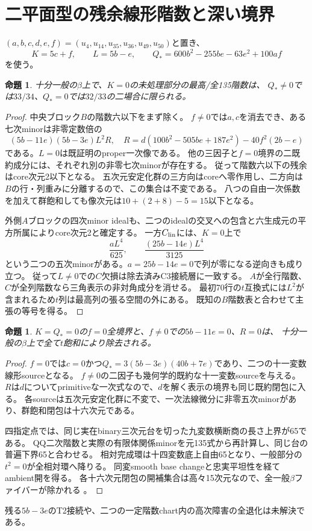 \documentclass[11pt,a4paper]{ltjsarticle}
\newtheorem{proposition}[theorem]{命題}
\theoremstyle{remark}
\begin{document}
\section{二平面型の残余線形階数と深い境界}
$(a,b,c,d,e,f)=(u_4,u_{14},u_{35},u_{36},u_{49},u_{50})$と置き、
\[
 K=5c+f,\qquad L=5b-e,\qquad Q_*=600b^2-255be-63e^2+100af
\]
を使う。
\begin{proposition}
十分一般の$\beta$上で、$K=0$の未処理部分の最高/全135階数は、
$Q_*\ne0$では$33/34$、$Q_*=0$では$32/33$の二場合に限られる。
\end{proposition}
\begin{proof}
中央ブロック$B$の階数六以下をまず除く。
$f\ne0$では$a,c$を消去でき、ある七次minorは非零定数倍の
\[
 (5b-11e)(5b-3e)L^2R,\quad
 R=d(100b^2-505be+187e^2)-40f^2(2b-e)
\]
である。$L=0$は既証明のproper一次像である。
他の三因子と$f=0$境界の二既約成分には、それぞれ別の非零七次minorが存在する。
従って階数六以下の残余はcore次元2以下となる。
五次元安定化群の三方向はcoreへ零作用し、二方向は$B$の行・列重みに分離するので、この集合は不変である。
八つの自由一次係数を加えて群飽和しても像次元は$10+(2+8)-5=15$以下となる\cite{binary-rank6-v41}。

外側$A$ブロックの四次minor idealも、二つのidealの交叉への包含と六生成元の平方所属によりcore次元2と確定する。
一方$C_{\rm lin}$には、$K=0$上で
\[
 \frac{aL^4}{625},\qquad \frac{(25b-14e)L^4}{3125}
\]
という二つの五次minorがある。$a=25b-14e=0$で列が零になる逆向きも成り立つ。
従って$L\ne0$での$C$欠損は除去済みC3接続層に一致する。
$A$が全行階数、$C$が全列階数なら三角表示の非対角成分を消せる。
最初70行の$t$互換式には$L^2$が含まれるため$t$列は最高列の張る空間の外にある。
既知の$B$階数表と合わせて主張の等号を得る\cite{binary-linear-v41}。
\end{proof}

\begin{proposition}
$K=Q_*=0$の$f=0$全境界と、$f\ne0$での$5b-11e=0$、$R=0$は、
十分一般の$\beta$上で全て$t$飽和により除去される。
\end{proposition}
\begin{proof}
$f=0$では$c=0$かつ$Q_*=3(5b-3e)(40b+7e)$であり、二つの十一変数線形sourceとなる。
$f\ne0$の二因子も幾何学的既約な十一変数sourceを与える。
$R$は$d$についてprimitiveな一次式なので、$d$を解く表示の境界も同じ既約閉包に入る。
各sourceは五次元安定化群に不変で、一次法線微分に非零五次minorがあり、群飽和閉包は十六次元である。

四指定点では、同じ実在binary三次元台を切った九変数横断商の長さ上界が65である。
QQ二次階数と実際の有限体関係minorを元135式から再計算し、同じ台の普遍下界65と合わせる。
相対完成環は十四変数底上自由65となり、一般部分の$t^2=0$が全相対環へ降りる。
同変smooth base changeと忠実平坦性を経てambient開を得る。
各十六次元閉包の開補集合は高々15次元なので、全一般$\beta$ファイバーが除かれる
\cite{binary-deep-boundary-v41,binary-pivot-v41}。
\end{proof}
残る$5b-3e$のT2接続や、二つの一定階数chart内の高次障害の全退化は未解決である。
\end{document}

